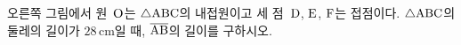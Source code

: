\noindent\begin{minipage}[t]{0.58\linewidth}\vspace{0pt}\raggedright 오른쪽 그림에서 원~$\mathrm{O}$는 $\triangle\mathrm{ABC}$의 내접원이고 세 점~$\mathrm{D}$, $\mathrm{E}$, $\mathrm{F}$는 접점이다. $\triangle\mathrm{ABC}$의 둘레의 길이가 $28\,\mathrm{cm}$일 때, $\overline{\mathrm{AB}}$의 길이를 구하시오.\end{minipage}\hfill\begin{minipage}[t]{0.4\linewidth}\vspace{0pt}\centering \resizebox{\ifdim\width>\linewidth\linewidth\else\width\fi}{!}{}\end{minipage}\par

